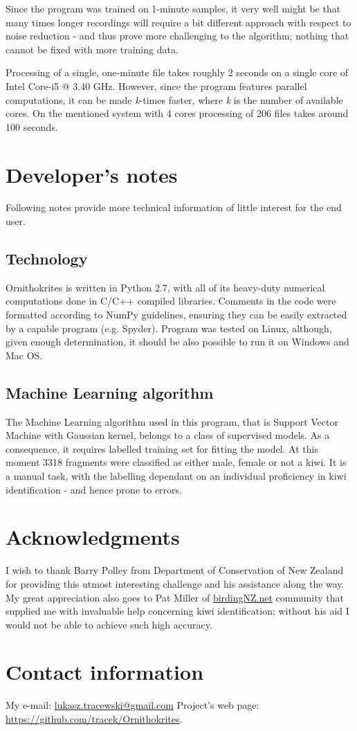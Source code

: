 \documentclass[paper=a4, fontsize=11pt]{scrartcl}	%
\numberwithin{equation}{section}		%
\numberwithin{figure}{section}			%
\numberwithin{table}{section}				%
\begin{document}
Since the program was trained on 1-minute samples, it very well might be that many times longer recordings will require a bit different approach with respect to noise reduction - and thus prove more challenging to the algorithm; nothing that cannot be fixed with more training data.

Processing of a single, one-minute file takes roughly 2 seconds on a single core of Intel Core-i5 @ 3.40 GHz. However, since the program features parallel computations, it can be made \textit{k}-times faster, where \textit{k} is the number of available cores. On the mentioned system with 4 cores processing of 206 files takes around 100 seconds.

\section{Developer's notes}
Following notes provide more technical information of little interest for the end user.
\subsection{Technology}
Ornithokrites is written in Python 2.7, with all of its heavy-duty numerical computations done in C/C++ compiled libraries. Comments in the code were formatted according to NumPy guidelines, ensuring they can be easily extracted by a capable program (e.g. Spyder). Program was tested on Linux, although, given enough determination, it should be also possible to run it on Windows and Mac OS.
\subsection{Machine Learning algorithm}
The Machine Learning algorithm used in this program, that is Support Vector Machine with Gaussian kernel, belongs to a class of supervised models. As a consequence, it requires labelled training set for fitting the model. At this moment 3318 fragments were classified as either male, female or not a kiwi. It is a manual task, with the labelling dependant on an individual proficiency in kiwi identification - and hence prone to errors.

\section{Acknowledgments}
I wish to thank Barry Polley from Department of Conservation of New Zealand for providing this utmost interesting challenge and his assistance along the way. My great appreciation also goes to Pat Miller of \url{birdingNZ.net} community that supplied me with invaluable help concerning kiwi identification; without his aid I would not be able to achieve such high accuracy.

\section{Contact information}
My e-mail: \href{mailto:lukasz.tracewski@gmail.com}{lukasz.tracewski@gmail.com}
\newline
Project's web page: \url{https://github.com/tracek/Ornithokrites}.

\end{document}
